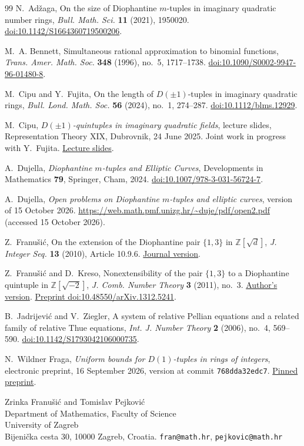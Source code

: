 \documentclass[12pt]{article}
\numberwithin{equation}{section}
\begin{document}
\begin{thebibliography}{99}
 N.~Ad\v zaga, On the size of Diophantine $m$-tuples in
imaginary quadratic number rings, \emph{Bull. Math. Sci.} \textbf{11}
(2021), 1950020.
\href{https://doi.org/10.1142/S1664360719500206}{doi:10.1142/S1664360719500206}.

 M.~A. Bennett, Simultaneous rational approximation
to binomial functions, \emph{Trans. Amer. Math. Soc.} \textbf{348}
(1996), no.~5, 1717--1738.
\href{https://doi.org/10.1090/S0002-9947-96-01480-8}{doi:10.1090/S0002-9947-96-01480-8}.

 M.~Cipu and Y.~Fujita, On the length of $D(\pm1)$-tuples
in imaginary quadratic rings, \emph{Bull. Lond. Math. Soc.}
\textbf{56} (2024), no.~1, 274--287.
\href{https://doi.org/10.1112/blms.12929}{doi:10.1112/blms.12929}.

 M.~Cipu, \emph{$D(\pm1)$-quintuples in imaginary
quadratic fields}, lecture slides, Representation Theory XIX,
Dubrovnik, 24 June 2025. Joint work in progress with Y.~Fujita.
\href{https://web.math.pmf.unizg.hr/~congress/Dubrovnik25/Slides-NT-25/Cipu.pdf}{Lecture slides}.

 A.~Dujella, \emph{Diophantine $m$-tuples and Elliptic
Curves}, Developments in Mathematics \textbf{79}, Springer, Cham, 2024.
\href{https://doi.org/10.1007/978-3-031-56724-7}{doi:10.1007/978-3-031-56724-7}.

 A.~Dujella, \emph{Open problems on Diophantine
$m$-tuples and elliptic curves}, version of 15 October 2026.
\url{https://web.math.pmf.unizg.hr/~duje/pdf/open2.pdf}
(accessed 15 October 2026).

 Z.~Franu\v{s}i\'c, On the extension of the Diophantine
pair $\{1,3\}$ in $\mathbb Z[\sqrt d]$, \emph{J. Integer Seq.}
\textbf{13} (2010), Article 10.9.6.
\href{https://cs.uwaterloo.ca/journals/JIS/VOL13/Franusic/franusic4.html}{Journal version}.

 Z.~Franu\v{s}i\'c and D.~Kreso, Nonextensibility
of the pair $\{1,3\}$ to a Diophantine quintuple in
$\mathbb Z[\sqrt{-2}]$, \emph{J. Comb. Number Theory}
\textbf{3} (2011), no.~3.
\href{https://web.math.pmf.unizg.hr/~fran/clanci/dz-web.pdf}{Author's version}.
\href{https://doi.org/10.48550/arXiv.1312.5241}{Preprint doi:10.48550/arXiv.1312.5241}.

 B.~Jadrijevi\'c and V.~Ziegler, A system of relative
Pellian equations and a related family of relative Thue equations,
\emph{Int. J. Number Theory} \textbf{2} (2006), no.~4, 569--590.
\href{https://doi.org/10.1142/S1793042106000735}{doi:10.1142/S1793042106000735}.

 N.~Wildner Fraga, \emph{Uniform bounds for $D(1)$-tuples in
rings of integers}, electronic preprint, 16 September 2026,
version at commit \texttt{768dda32edc7}.
\href{https://github.com/natanaelwf/Solving-Open-Problems/blob/768dda32edc7166f9dd094b419df250b1e008531/dujella-problems-1.12-1.13/README.md}{Pinned preprint}.
\end{thebibliography}
\bigskip
\noindent Zrinka Franu\v{s}i\'{c} and Tomislav Pejkovi\'{c}\\
Department of Mathematics, Faculty of Science\\
University of Zagreb\\
Bijenička cesta 30, 10000 Zagreb, Croatia. \texttt{fran@math.hr}, \texttt{pejkovic@math.hr}
\end{document}
